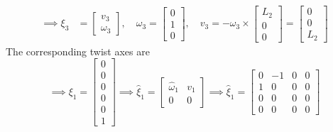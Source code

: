 \begin{align*}
    \implies
    \xi_{3}
     & =
    \begin{bmatrix}
        v_3 \\
        \omega_3
    \end{bmatrix},
    \quad
    \omega_3
    =
    \begin{bmatrix}
        0 \\
        1 \\
        0
    \end{bmatrix},
    \quad
    v_3
    =
    - \omega_3 \times
    \begin{bmatrix}
        L_2 \\
        0   \\
        0
    \end{bmatrix}
    =
    \begin{bmatrix}
        0 \\
        0 \\
        L_2
    \end{bmatrix}
\end{align*}
The corresponding twist axes are
\begin{equation*}
    \implies
    \xi_{1}
    =
    \begin{bmatrix}
        0 \\
        0 \\
        0 \\
        0 \\
        0 \\
        1
    \end{bmatrix}
    \implies
    \widehat{\xi}_{1}
    =
    \begin{bmatrix}
        \widehat{\omega}_{1} & v_1 \\
        0                    & 0
    \end{bmatrix}
    \implies
    \boxed{
        \widehat{\xi}_{1}
        =
        \begin{bmatrix}
            0 & -1 & 0 & 0 \\
            1 & 0  & 0 & 0 \\
            0 & 0  & 0 & 0 \\
            0 & 0  & 0 & 0
        \end{bmatrix}
    }
\end{equation*}

